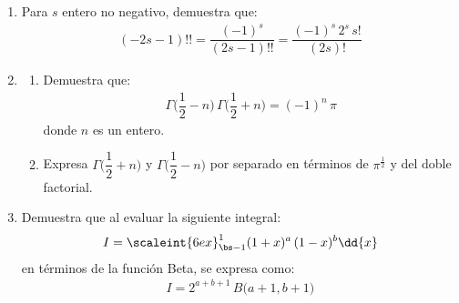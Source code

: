\begin{enumerate}
\item Para $s$ entero no negativo, demuestra que:
\begin{align*}
(- 2 s - 1)!! = \dfrac{(-1)^{s}}{(2 s - 1)!!} = \dfrac{(-1)^{s} \, 2^{s} \, s!}{(2 s)!}
\end{align*}
\item \begin{enumerate}[label=\alph*)]
\item Demuestra que:
\begin{align*}
\Gamma \bigg( \dfrac{1}{2} - n \bigg) \, \Gamma \bigg( \dfrac{1}{2} + n \bigg) = (-1)^{n} \, \pi
\end{align*}
donde $n$ es un entero.
\item Expresa $\Gamma \bigg( \dfrac{1}{2} + n \bigg)$ y $\Gamma \bigg( \dfrac{1}{2} - n \bigg)$ por separado en términos de $\pi^{\frac{1}{2}}$ y del doble factorial.
\end{enumerate}
\item Demuestra que al evaluar la siguiente integral:
\begin{align*}
I = \scaleint{6ex}_{\bs -1}^{1} (1 + x)^{a} \, (1 - x)^{b} \dd{x}
\end{align*}
en términos de la función Beta, se expresa como:
\begin{align*}
I = 2^{a+b+1} \, B \big( a + 1, b + 1 \big)
\end{align*}
\end{enumerate}
